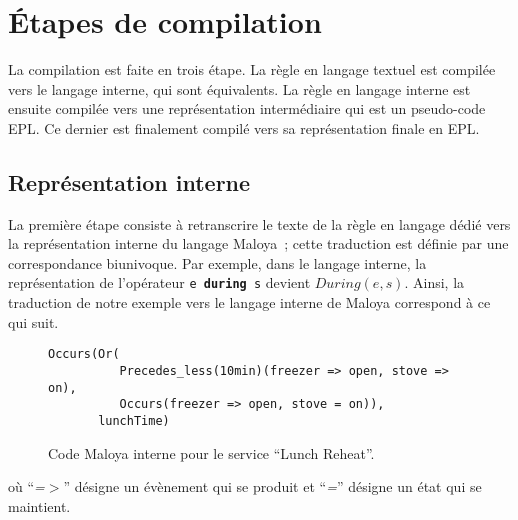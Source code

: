 \section{Étapes de compilation}\label{dsl:compilation}
La compilation est faite en trois étape. La règle en langage textuel est 
compilée vers le langage interne, qui sont équivalents. La règle en 
langage interne est ensuite compilée vers une représentation intermédiaire qui est un 
pseudo-code EPL. Ce dernier est finalement compilé vers sa représentation finale en EPL.
\clearpage
\subsection{Représentation interne}
La première étape consiste à retranscrire le texte de la règle en langage dédié vers 
la représentation interne du langage Maloya~; cette traduction est définie par une correspondance biunivoque.
Par exemple, dans le langage interne, la représentation de l'opérateur {\tt e {\bf during} s} devient $During(e,s)$. 
Ainsi, la traduction de notre exemple vers le langage interne de Maloya correspond à ce qui suit.
\begin{figure}[!h]
\begin{lstlisting}[language=Maloya]
  Occurs(Or(
          Precedes_less(10min)(freezer => open, stove => on),
          Occurs(freezer => open, stove = on)),
       lunchTime)
\end{lstlisting}
\caption{Code Maloya interne pour le service ``Lunch Reheat''.}
\label{listing:maloya_reheat}
\end{figure}

\noindent
où ``{\em =$>$}'' désigne un évènement qui se produit et ``{\em =}'' désigne un 
état qui se maintient.

